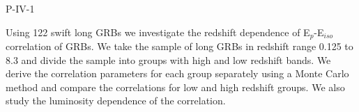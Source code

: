 P-IV-1


\bigskip



\bigskip

\noindent Using 122 swift long GRBs we investigate the redshift dependence of E$_p$-E$_{iso}$ correlation of GRBs. 
We take the sample of long GRBs in redshift range 0.125 to 8.3 and 
divide the sample into groups with high and low redshift bands. We derive the correlation parameters for each group separately using a Monte Carlo method and compare the correlations for low and high redshift groups.
We also study the luminosity dependence of the correlation.

